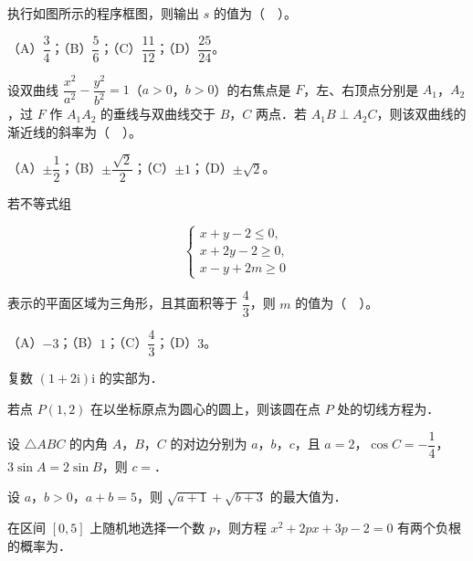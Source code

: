 \begin{question}
执行如图所示的程序框图，则输出 $s$ 的值为（　）。
\nopagebreak[4]
\begin{center}\end{center}
\nopagebreak[4]
（A）$\dfrac{3}{4}$；（B）$\dfrac{5}{6}$；（C）$\dfrac{11}{12}$；（D）$\dfrac{25}{24}$。

\end{question}
\begin{question}
设双曲线 $\dfrac{x^{2}}{a^{2}}-\dfrac{y^{2}}{b^{2}}=1$（$a>0$，$b>0$）的右焦点是 $F$，左、右顶点分别是 $A_{1}$，$A_{2}$，过 $F$ 作 $A_{1}A_{2}$ 的垂线与双曲线交于 $B$，$C$ 两点．若 $A_{1}B\perp A_{2}C$，则该双曲线的渐近线的斜率为（　）。

（A）$\pm\dfrac{1}{2}$；（B）$\pm\dfrac{\sqrt{2}}{2}$；（C）$\pm1$；（D）$\pm\sqrt{2}$。

\end{question}
\begin{question}
若不等式组

\nopagebreak[4]
\[
\begin{cases}
x+y-2\le 0,\\
x+2y-2\ge 0,\\
x-y+2m\ge 0
\end{cases}
\]

表示的平面区域为三角形，且其面积等于 $\dfrac{4}{3}$，则 $m$ 的值为（　）。

（A）$-3$；（B）$1$；（C）$\dfrac{4}{3}$；（D）$3$。

\end{question}

\begin{question}
复数 $(1+2\mathrm{i})\mathrm{i}$ 的实部为\gkblank{}．

\end{question}
\begin{question}
若点 $P(1,2)$ 在以坐标原点为圆心的圆上，则该圆在点 $P$ 处的切线方程为\gkblank{}．

\end{question}
\begin{question}
设 $\triangle ABC$ 的内角 $A$，$B$，$C$ 的对边分别为 $a$，$b$，$c$，且 $a=2$，$\cos C=-\dfrac{1}{4}$，$3\sin A=2\sin B$，则 $c=$\gkblank{}．

\end{question}
\begin{question}
设 $a$，$b>0$，$a+b=5$，则 $\sqrt{a+1}+\sqrt{b+3}$ 的最大值为\gkblank{}．

\end{question}
\begin{question}
在区间 $[0,5]$ 上随机地选择一个数 $p$，则方程 $x^{2}+2px+3p-2=0$ 有两个负根的概率为\gkblank{}．

\end{question}

